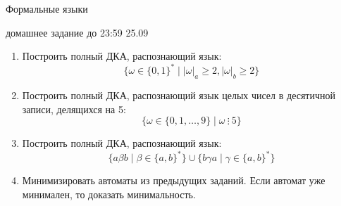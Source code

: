 \documentclass[12pt]{article}
\begin{document}
\begin{center} {\LARGE Формальные языки} \end{center}

\begin{center} \Large домашнее задание до 23:59 25.09 \end{center}
\bigskip

\begin{enumerate}
  \item Построить полный ДКА, распознающий язык: \[ \{ \omega \in \{ 0, 1 \}^* \mid |\omega|_a \geq 2, |\omega|_b \geq 2 \} \]
  \item Построить полный ДКА, распознающий язык целых чисел в десятичной записи, делящихся на 5: \[ \{ \omega \in \{ 0, 1, \dots, 9 \} \mid \omega \ \vdots \ 5 \} \]
  \item Построить полный ДКА, распознающий язык: \[ \{ a \beta b \mid \beta \in \{ a, b \}^* \} \cup \{ b \gamma a \mid \gamma \in \{ a, b\}^* \} \] 
  \item Минимизировать автоматы из предыдущих заданий. Если автомат уже минимален, то доказать минимальность. 
\end{enumerate}
\end{document}
